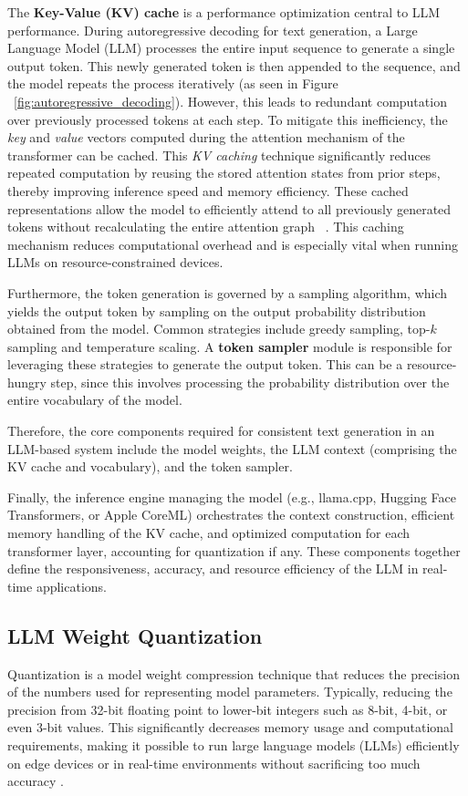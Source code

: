 The \textbf{Key-Value (KV) cache} is a performance optimization central to LLM performance. During autoregressive decoding for text generation, a Large Language Model (LLM) processes the entire input sequence to generate a single output token. This newly generated token is then appended to the sequence, and the model repeats the process iteratively (as seen in Figure ~\ref{fig:autoregressive_decoding}). However, this leads to redundant computation over previously processed tokens at each step. To mitigate this inefficiency, the \textit{key} and \textit{value} vectors computed during the attention mechanism of the transformer can be cached. This \textit{KV caching} technique significantly reduces repeated computation by reusing the stored attention states from prior steps, thereby improving inference speed and memory efficiency. These cached representations allow the model to efficiently attend to all previously generated tokens without recalculating the entire attention graph ~\cite{alammar2018illustrated}. This caching mechanism reduces computational overhead and is especially vital when running LLMs on resource-constrained devices.

Furthermore, the token generation is governed by a sampling algorithm, which yields the output token by sampling on the output probability distribution obtained from the model. Common strategies include greedy sampling, top-$k$ sampling and temperature scaling. A \textbf{token sampler} module is responsible for leveraging these strategies to generate the output token. This can be a resource-hungry step, since this involves processing the probability distribution over the entire vocabulary of the model.

Therefore, the core components required for consistent text generation in an LLM-based system include the model weights, the LLM context (comprising the KV cache and vocabulary), and the token sampler.

Finally, the inference engine managing the model (e.g., llama.cpp, Hugging Face Transformers, or Apple CoreML) orchestrates the context construction, efficient memory handling of the KV cache, and optimized computation for each transformer layer, accounting for quantization if any. These components together define the responsiveness, accuracy, and resource efficiency of the LLM in real-time applications.

\subsection{LLM Weight Quantization}
\label{sec:LLMWeightQuantization} 
Quantization is a model weight compression technique that reduces the precision of the numbers used for representing model parameters. Typically, reducing the precision from 32-bit floating point to lower-bit integers such as 8-bit, 4-bit, or even 3-bit values. This significantly decreases memory usage and computational requirements, making it possible to run large language models (LLMs) efficiently on edge devices or in real-time environments without sacrificing too much accuracy \cite{jacob2017quantization,hubara2016quantized}.


